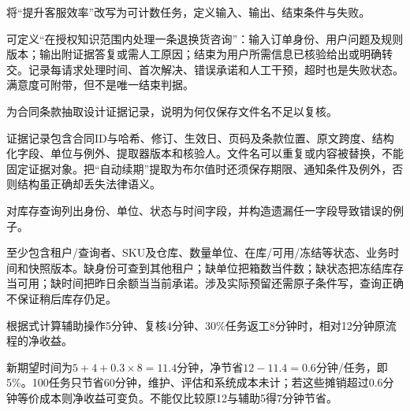 
\begin{exercises}
\begin{exercise} 将“提升客服效率”改写为可计数任务，定义输入、输出、结束条件与失败。

\begin{solution}
可定义“在授权知识范围内处理一条退换货咨询”：输入订单身份、用户问题及规则版本；输出附证据答复或需人工原因；结束为用户所需信息已核验给出或明确转交。记录每请求处理时间、首次解决、错误承诺和人工干预，超时也是失败状态。满意度可附带，但不是唯一结束判据。
\end{solution}
\end{exercise}

\begin{exercise}\optional 为合同条款抽取设计证据记录，说明为何仅保存文件名不足以复核。

\begin{solution}
证据记录包含合同ID与哈希、修订、生效日、页码及条款位置、原文跨度、结构化字段、单位与例外、提取器版本和核验人。文件名可以重复或内容被替换，不能固定证据对象。把“自动续期”提取为布尔值时还须保存期限、通知条件及例外，否则结构虽正确却丢失法律语义。
\end{solution}
\end{exercise}

\begin{exercise}\optional 对库存查询列出身份、单位、状态与时间字段，并构造遗漏任一字段导致错误的例子。

\begin{solution}
至少包含租户/查询者、SKU及仓库、数量单位、在库/可用/冻结等状态、业务时间和快照版本。缺身份可查到其他租户；缺单位把箱数当件数；缺状态把冻结库存当可用；缺时间把昨日余额当当前承诺。涉及实际预留还需原子条件写，查询正确不保证稍后库存仍足。
\end{solution}
\end{exercise}

\begin{exercise} 根据式计算辅助操作5分钟、复核4分钟、30\%任务返工8分钟时，相对12分钟原流程的净收益。

\begin{solution}
新期望时间为$5+4+0.3\times8=11.4$分钟，净节省$12-11.4=0.6$分钟/任务，即5\%。100任务只节省60分钟，维护、评估和系统成本未计；若这些摊销超过0.6分钟等价成本则净收益可变负。不能仅比较原12与辅助5得7分钟节省。
\end{solution}
\end{exercise}


\end{exercises}
